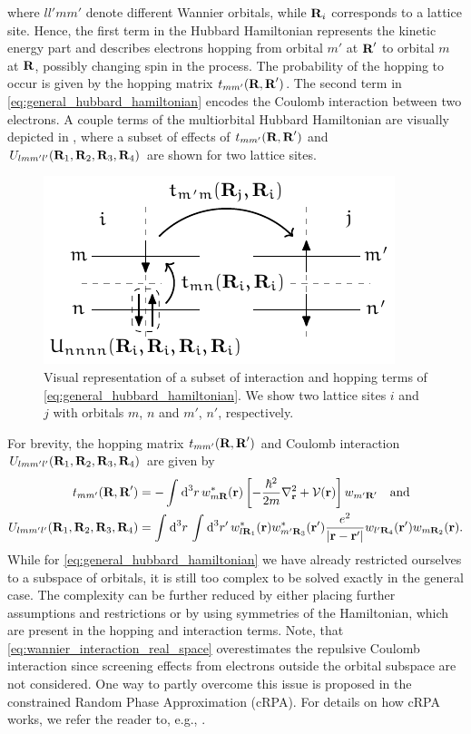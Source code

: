\documentclass[\main/main.tex]{subfiles}
\begin{document}
where $ll'mm'$ denote different Wannier orbitals, while $\textbf{R}_i$ corresponds to a lattice site. Hence, the first term in the Hubbard Hamiltonian represents the kinetic energy part and describes electrons hopping from orbital $m'$ at $\textbf{R}'$ to orbital $m$ at $\textbf{R}$, possibly changing spin in the process. The probability of the hopping to occur is given by the hopping matrix $t_{mm'}(\textbf{R},\textbf{R}')$. The second term in \eqref{eq:general_hubbard_hamiltonian} encodes the Coulomb interaction between two electrons. A couple terms of the multiorbital Hubbard Hamiltonian are visually depicted in , where a subset of effects of $t_{mm'}(\textbf{R},\textbf{R}')$ and $U_{lmm'l'}(\textbf{R}_1,\textbf{R}_2,\textbf{R}_3,\textbf{R}_4)$ are shown for two lattice sites. 
\begin{figure}[ht!]
	\centering
	\includegraphics[width=.45\textwidth]{../../Graphics/Diagrams/two_orbitals_two_sites_hopping/two_orbitals_two_sites_hopping.pdf}
	\caption{Visual representation of a subset of interaction and hopping terms of \eqref{eq:general_hubbard_hamiltonian}. We show two lattice sites $i$ and $j$ with orbitals $m$, $n$ and $m'$, $n'$, respectively.}
	\label{fig:two_orbitals_two_sites_hopping}
\end{figure}
For brevity, the hopping matrix $t_{mm'}(\textbf{R},\textbf{R}')$ and Coulomb interaction $U_{lmm'l'}(\textbf{R}_1,\textbf{R}_2,\textbf{R}_3,\textbf{R}_4)$ are given by
\begin{subequations}
\begin{align}
	t_{mm'}(\textbf{R},\textbf{R}')&=-\int_{}^{}\text{d}^3r\,w^*_{m\textbf{R}}(\textbf{r})\left [-\frac{\hbar^2}{2m}\nabla^2_{\textbf{r}}+\mathcal{V}(\textbf{r})\right ]w_{m'\textbf{R}'}\quad\text{and}\\
	U_{lmm'l'}(\textbf{R}_1,\textbf{R}_2,\textbf{R}_3,\textbf{R}_4)&=\int_{}^{}\text{d}^3r\,\int_{}^{}\text{d}^3r'\,w^*_{l\textbf{R}_1}(\textbf{r})w^*_{m'\textbf{R}_3}(\textbf{r}')\frac{e^2}{|\textbf{r}-\textbf{r}'|}w_{l'\textbf{R}_4}(\textbf{r}')w_{m\textbf{R}_2}(\textbf{r}).\label{eq:wannier_interaction_real_space}
\end{align}
\end{subequations}
While for \eqref{eq:general_hubbard_hamiltonian} we have already restricted ourselves to a subspace of orbitals, it is still too complex to be solved exactly in the general case. The complexity can be further reduced by either placing further assumptions and restrictions or by using symmetries of the Hamiltonian, which are present in the hopping and interaction terms. Note, that \eqref{eq:wannier_interaction_real_space} overestimates the repulsive Coulomb interaction since screening effects from electrons outside the orbital subspace are not considered. One way to partly overcome this issue is proposed in the constrained Random Phase Approximation (cRPA). For details on how cRPA works, we refer the reader to, e.g., \cite{Zhang2022}. 
\end{document}
